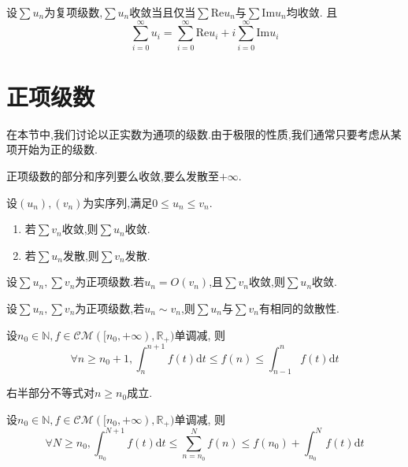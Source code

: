 \begin{prop}
    设$\sum u_n$为复项级数,$\sum u_n$收敛当且仅当$\sum \mathrm{Re} u_n$与$\sum \mathrm{Im} u_n$均收敛.
    且$$\sum\limits_{i = 0}^{\infty} u_i = \sum\limits_{i = 0}^{\infty} \mathrm{Re} u_i + i
    \sum\limits_{i = 0}^{\infty} \mathrm{Im} u_i$$
\end{prop}

\section{正项级数}

在本节中,我们讨论以正实数为通项的级数.由于极限的性质,我们通常只要考虑从某项开始为正的级数.

\begin{prop}
    正项级数的部分和序列要么收敛,要么发散至$+ \infty$.
\end{prop}

\begin{prop}
    设$(u_n), (v_n)$为实序列,满足$0\leqslant u_n \leqslant v_n$.
    \begin{enumerate}
        \item 若$\sum v_n$收敛,则$\sum u_n$收敛.
        \item 若$\sum u_n$发散,则$\sum v_n$发散.
    \end{enumerate}
\end{prop}

\begin{cor}
    设$\sum u_n, \sum v_n$为正项级数.若$u_n = O(v_n)$,且$\sum v_n$收敛,则$\sum u_n$收敛.
\end{cor}

\begin{cor}
    设$\sum u_n, \sum v_n$为正项级数,若$u_n \sim v_n$,则$\sum u_n$与$\sum v_n$有相同的敛散性.
\end{cor}

\begin{lem}
    设$n_0 \in \mathbb{N}, f \in \mathcal{CM}([n_0, + \infty), \mathbb{R}_+)$单调减,
    则$$\forall n \geqslant n_0 + 1, \int_n^{n + 1} f(t) \mathrm{d}t \leqslant f(n)
    \leqslant \int_{n - 1}^n f(t) \mathrm{d}t$$
\end{lem}

\begin{rqq}
    右半部分不等式对$n \geqslant n_0$成立.
\end{rqq}

\begin{prop}
    设$n_0 \in \mathbb{N}, f \in \mathcal{CM}([n_0, + \infty), \mathbb{R}_+)$单调减,
    则$$\forall N \geqslant n_0, \int_{n_0}^{N + 1} f(t) \mathrm{d}t \leqslant 
    \sum\limits_{n = n_0}^N f(n) \leqslant f(n_0)+\int_{n_0}^N f(t) \mathrm{d}t$$
\end{prop}

